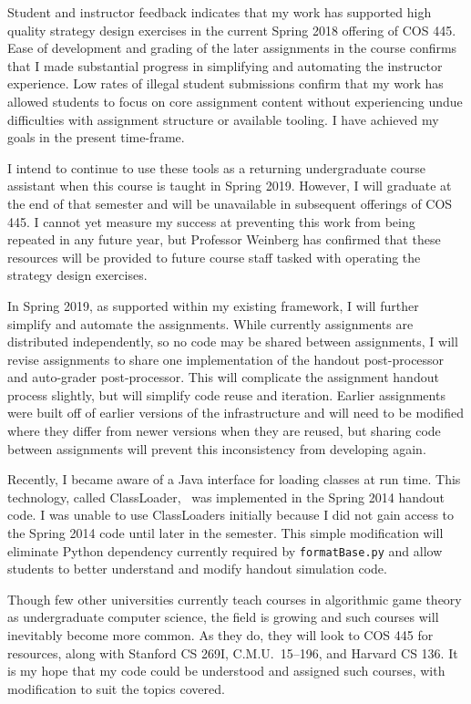 \documentclass[pageno]{jpaper}
\begin{document}
Student and instructor feedback indicates that my work has supported high quality strategy design exercises in the current Spring 2018 offering of COS 445.
Ease of development and grading of the later assignments in the course confirms that I made substantial progress in simplifying and automating the instructor experience.
Low rates of illegal student submissions confirm that my work has allowed students to focus on core assignment content without experiencing undue difficulties with assignment structure or available tooling.
I have achieved my goals in the present time-frame.

I intend to continue to use these tools as a returning undergraduate course assistant when this course is taught in Spring 2019.
However, I will graduate at the end of that semester and will be unavailable in subsequent offerings of COS 445.
I cannot yet measure my success at preventing this work from being repeated in any future year, but Professor Weinberg has confirmed that these resources will be provided to future course staff tasked with operating the strategy design exercises.

In Spring 2019, as supported within my existing framework, I will further simplify and automate the assignments.
While currently assignments are distributed independently, so no code may be shared between assignments, I will revise assignments to share one implementation of the handout post-processor and auto-grader post-processor.
This will complicate the assignment handout process slightly, but will simplify code reuse and iteration.
Earlier assignments were built off of earlier versions of the infrastructure and will need to be modified where they differ from newer versions when they are reused, but sharing code between assignments will prevent this inconsistency from developing again.

Recently, I became aware of a Java interface for loading classes at run time.
This technology, called ClassLoader,~\cite{https://docs.oracle.com/javase/9/docs/api/java/lang/ClassLoader.html} was implemented in the Spring 2014 handout code.
I was unable to use ClassLoaders initially because I did not gain access to the Spring 2014 code until later in the semester.
This simple modification will eliminate Python dependency currently required by \texttt{formatBase.py} and allow students to better understand and modify handout simulation code.

Though few other universities currently teach courses in algorithmic game theory as undergraduate computer science, the field is growing and such courses will inevitably become more common.
As they do, they will look to COS 445 for resources, along with Stanford CS 269I, C.M.U.\ 15--196, and Harvard CS 136.
It is my hope that my code could be understood and assigned such courses, with modification to suit the topics covered.
\end{document}
